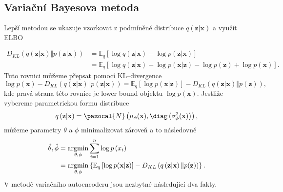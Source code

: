 \subsection{Variační Bayesova metoda}
Lepší metodou se ukazuje vzorkovat z podmíněné distribuce $q(\textbf{z}\vert \textbf{x})$ a využít ELBO

\begin{equation}
\begin{split}
D_{KL}\left(q\left(\textbf{z}\vert \textbf{x} \right) \Vert p(\textbf{z}\vert \textbf{x})\right) & = 
 \mathbb{E}_q\left[\log q(\textbf{z}\vert \textbf{x}) - \log p\left(\textbf{z}\vert \textbf{x} \right)\right] \\
 & =  \mathbb{E}_q\left[\log q(\textbf{z}\vert \textbf{x}) - \log p(\textbf{x}\vert \textbf{z}) - \log p(\textbf{z}) + \log p(\textbf{x})   \right] .
 \end{split}
\end{equation}
Tuto rovnici můžeme přepsat pomocí KL--divergence 
\begin{equation}
\log p(\textbf{x}) - D_{KL}\left(q\left(\textbf{z}\vert \textbf{x} \right) \Vert p(\textbf{z}\vert \textbf{x})\right) = \mathbb{E}_q\left[\log p(\textbf{x}\vert \textbf{z}) \right] - D_{KL}\left(q\left(\textbf{z}\vert\textbf{x} \right) \Vert p(\textbf{z})\right) ,
\end{equation}
kde pravá strana této rovnice je lower bound objektu $\log p(\textbf{x})$.
Jestliže vybereme parametrickou formu distribuce
\begin{equation}
q\left(\textbf{z}\vert \textbf{x} \right) = \pazocal{N}\left(\mu_{\phi}(\textbf{x}), \diag\left(\sigma^2_{\phi}(\textbf{x})\right) \right) ,
\end{equation}
můžeme parametry $\theta$ a $\phi$ minimalizovat zároveň a to následovně
\begin{equation}
\begin{split}
\hat{\theta},\hat{\phi} & = \mathop{\mathrm{argmin}}_{\theta, \phi}\sum_{i=1}^n\log p\left(x_i\right) \\
& = \mathop{\mathrm{argmin}}_{\theta, \phi}\left\lbrace  \mathbb{E}_q\left[\log p(\textbf{x}\vert \textbf{z}) \right] - D_{KL}\left(q\left(\textbf{z}\vert \textbf{x} \right) \Vert p(\textbf{z})\right)\right\rbrace . 
\end{split}
\end{equation}
V metodě variačního autoencoderu jsou nezbytné následující dva fakty.
